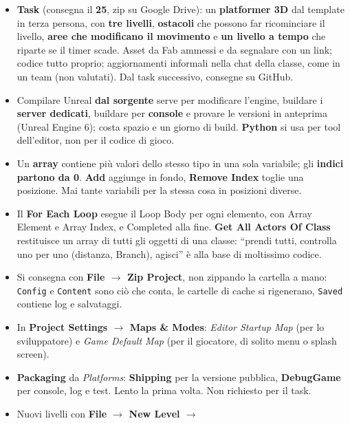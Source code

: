 \begin{itemize}
  \item \textbf{Task} (consegna il \textbf{25}, zip su Google Drive): un
        \textbf{platformer 3D} dal template in terza persona, con \textbf{tre
        livelli}, \textbf{ostacoli} che possono far ricominciare il livello,
        \textbf{aree che modificano il movimento} e \textbf{un livello a
        tempo} che riparte se il timer scade. Asset da Fab ammessi e da
        segnalare con un link; codice tutto proprio; aggiornamenti informali
        nella chat della classe, come in un team (non valutati). Dal task
        successivo, consegne su GitHub.
  \item Compilare Unreal \textbf{dal sorgente} serve per modificare l'engine,
        buildare i \textbf{server dedicati}, buildare per \textbf{console} e
        provare le versioni in anteprima (Unreal Engine 6); costa spazio e
        un giorno di build. \textbf{Python} si usa per tool dell'editor, non per
        il codice di gioco.
  \item Un \textbf{array} contiene più valori dello stesso tipo in una sola
        variabile; gli \textbf{indici partono da 0}. \textbf{Add} aggiunge in
        fondo, \textbf{Remove Index} toglie una posizione. Mai tante variabili
        per la stessa cosa in posizioni diverse.
  \item Il \textbf{For Each Loop} esegue il Loop Body per ogni elemento, con
        Array Element e Array Index, e Completed alla fine.
        \textbf{Get All Actors Of Class} restituisce un array di tutti gli
        oggetti di una classe: ``prendi tutti, controlla uno per uno
        (distanza, Branch), agisci'' è alla base di moltissimo codice.
  \item Si consegna con \textbf{File $\rightarrow$ Zip Project}, non
        zippando la cartella a mano: \texttt{Config} e \texttt{Content} sono
        ciò che conta, le cartelle di cache si rigenerano, \texttt{Saved}
        contiene log e salvataggi.
  \item In \textbf{Project Settings $\rightarrow$ Maps \& Modes}: \emph{Editor
        Startup Map} (per lo sviluppatore) e \emph{Game Default Map} (per il
        giocatore, di solito menu o splash screen).
  \item \textbf{Packaging} da \emph{Platforms}: \textbf{Shipping} per la
        versione pubblica, \textbf{DebugGame} per console, log e test. Lento la
        prima volta. Non richiesto per il task.
  \item Nuovi livelli con \textbf{File $\rightarrow$ New Level $\rightarrow$
}
\end{itemize}
